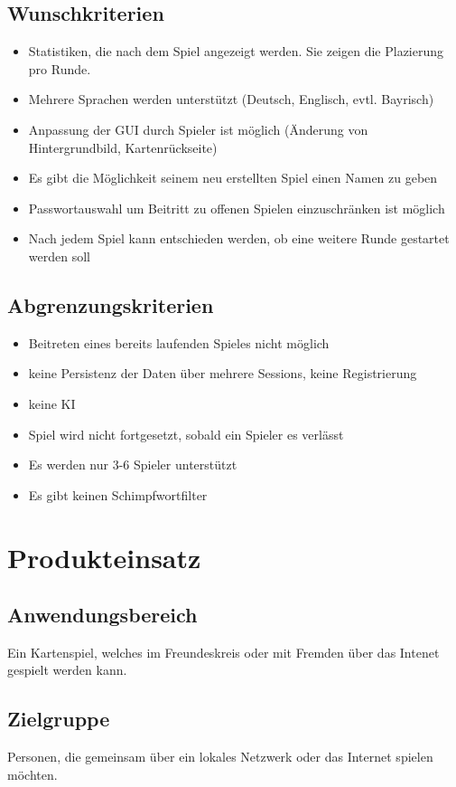 \documentclass{article}
\begin{document}
\subsection{Wunschkriterien}
\begin{itemize}
	\item Statistiken, die nach dem Spiel angezeigt werden. Sie zeigen die Plazierung pro Runde.
	\item Mehrere Sprachen werden unterstützt (Deutsch, Englisch, evtl. Bayrisch)
	\item Anpassung der GUI durch Spieler ist möglich (Änderung von Hintergrundbild, Kartenrückseite)
	\item Es gibt die Möglichkeit seinem neu erstellten Spiel einen Namen zu geben
	\item Passwortauswahl um Beitritt zu offenen Spielen einzuschränken ist möglich
	\item Nach jedem Spiel kann entschieden werden, ob eine weitere Runde gestartet werden soll
\end{itemize}

\subsection{Abgrenzungskriterien}
\begin{itemize}
	\item Beitreten eines bereits laufenden Spieles nicht möglich
	\item keine Persistenz der Daten über mehrere Sessions, keine Registrierung
	\item keine KI
	\item Spiel wird nicht fortgesetzt, sobald ein Spieler es verlässt
	\item Es werden nur 3-6 Spieler unterstützt
	\item Es gibt keinen Schimpfwortfilter
\end{itemize}

\section{Produkteinsatz}
\subsection{Anwendungsbereich}
Ein Kartenspiel, welches im Freundeskreis oder mit Fremden über das Intenet gespielt werden kann.
\subsection{Zielgruppe}
Personen, die gemeinsam über ein lokales Netzwerk oder das Internet spielen möchten. 
\end{document}
